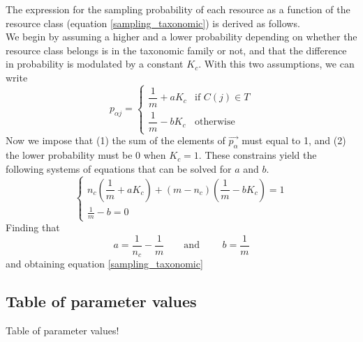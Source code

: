 \documentclass[12pt]{article}
\begin{document}
            The expression for the sampling probability of each resource as a function of the resource class (equation \ref{sampling_taxonomic}) is derived as follows.\\
            We begin by assuming a higher and a lower probability depending on whether the resource class belongs is in the taxonomic family or not, and that the difference in probability is modulated by a constant $K_c$. With this two assumptions, we can write
            \begin{equation}
                p_{\alpha j} = 
                 \begin{cases}
                    \dfrac{1}{m} + a K_c & \text{if } C(j) \in T  \\[10pt]
                    \dfrac{1}{m} - b K_c & \text{otherwise}
                 \end{cases}
             \end{equation}
            Now we impose that (1) the sum of the elements of $\vec{p_{\alpha}}$ must equal to 1, and (2) the lower probability must be 0 when $K_c = 1$. These constrains yield the following systems of equations that can be solved for $a$ and $b$.
            \begin{equation}
                \begin{cases}
                    n_c\left(\dfrac{1}{m} + a K_c\right) + (m-n_c)\left(\dfrac{1}{m} - b K_c\right) = 1 \\
                    \frac{1}{m} - b = 0
                \end{cases}
            \end{equation}
            Finding that 
            \begin{equation}
                a = \frac{1}{n_c} - \frac{1}{m} \qquad \text{and } \qquad b = \frac{1}{m}
            \end{equation}
            and obtaining equation \ref{sampling_taxonomic}
            
        \subsection{Table of parameter values}\label{parameter_values}
        Table of parameter values!
	\newpage
	
	
\end{document}
